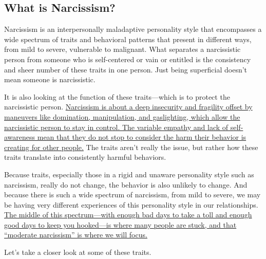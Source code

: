 \documentclass[11pt,letter]{article}
\begin{document}
\subsection{What is Narcissism?}

Narcissism is an interpersonally maladaptive personality style that encompasses
a wide spectrum of traits and behavioral patterns that present in different
ways, from mild to severe, vulnerable to malignant. What separates a
narcissistic person from someone who is self-centered or vain or entitled is
the consistency and sheer number of these traits in one person. Just being
superficial doesn’t mean someone is narcissistic. 

It is also looking at the function of these traits—which is to protect the
narcissistic person.  \ul{Narcissism is about a deep insecurity and fragility
offset by maneuvers like domination, manipulation, and gaslighting, which allow
the narcissistic person to stay in control. The variable empathy and lack of
self-awareness mean that they do not stop to consider the harm their behavior
is creating for other people.} The traits aren’t really the issue, but rather
how these traits translate into consistently harmful behaviors.

Because traits, especially those in a rigid and unaware personality style such
as narcissism, really do not change, the behavior is also unlikely to change.
And because there is such a wide spectrum of narcissism, from mild to severe,
we may be having very different experiences of this personality style in our
relationships. \ul{The middle of this spectrum—with enough bad days to take a
toll and enough good days to keep you hooked—is where many people are stuck,
and that “moderate narcissism” is where we will focus.}

Let’s take a closer look at some of these traits.
\end{document}
